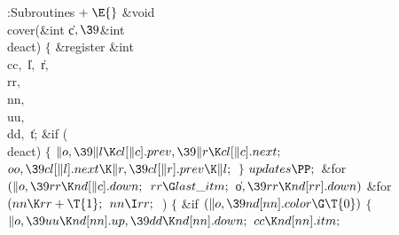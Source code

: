 \Y\B\4:Subroutines\X${}\mathrel+\E{}$\6
\1\1\&{void} \\{cover}(\&{int} \|c${},\39{}$\&{int} \\{deact})\2\2\6
${}\{{}$\1\6
\&{register} \&{int} \\{cc}${},{}$ \|l${},{}$ \|r${},{}$ \\{rr}${},{}$ %
\\{nn}${},{}$ \\{uu}${},{}$ \\{dd}${},{}$ \|t;\7
\&{if} (\\{deact})\5
${}\{{}$\1\6
${}\|o,\39\|l\K\\{cl}[\|c].\\{prev},\39\|r\K\\{cl}[\|c].\\{next};{}$\6
${}\\{oo},\39\\{cl}[\|l].\\{next}\K\|r,\39\\{cl}[\|r].\\{prev}\K\|l;{}$\6
\4${}\}{}$\2\6
${}\\{updates}\PP;{}$\6
\&{for} ${}(\|o,\39\\{rr}\K\\{nd}[\|c].\\{down};{}$ ${}\\{rr}\G\\{last%
\_itm};{}$ \|o${},\39\\{rr}\K\\{nd}[\\{rr}].\\{down}){}$\1\6
\&{for} ${}(\\{nn}\K\\{rr}+\T{1};{}$ ${}\\{nn}\I\\{rr};{}$ \,)\5
${}\{{}$\1\6
\&{if} ${}(\|o,\39\\{nd}[\\{nn}].\\{color}\G\T{0}){}$\5
${}\{{}$\1\6
${}\|o,\39\\{uu}\K\\{nd}[\\{nn}].\\{up},\39\\{dd}\K\\{nd}[\\{nn}].\\{down};{}$\6
${}\\{cc}\K\\{nd}[\\{nn}].\\{itm};{}$\6
